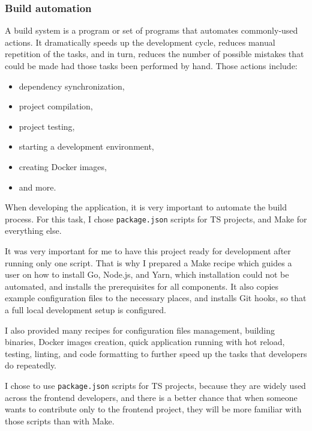 \subsubsection{Build automation}\label{sec:build-automation}

A build system is a program or set of programs
that automates commonly-used actions.
It dramatically speeds up the development cycle,
reduces manual repetition of the tasks,
and in turn,
reduces the number of possible mistakes
that could be made had those tasks
been performed by hand.
Those actions include:
\begin{itemize}
  \item dependency synchronization,
  \item project compilation,
  \item project testing,
  \item starting a development environment,
  \item creating Docker images,
  \item and more.
\end{itemize}

When developing the application,
it is very important to automate the build process.
For this task,
I chose \texttt{package.json} scripts
for \ac{TS} projects,
and Make for everything else.

It was very important for me
to have this project ready for development
after running only one script.
That is why I prepared a Make recipe
which guides a user on how to install
Go, Node.js, and Yarn,
which installation could not be automated,
and installs the prerequisites for all components.
It also copies example configuration files
to the necessary places,
and installs Git hooks,
so that a full local development setup
is configured.

I also provided many recipes
for configuration files management,
building binaries,
Docker images creation,
quick application running with hot reload,
testing,
linting, and
code formatting
to further speed up the tasks
that developers do repeatedly.

I chose to use \texttt{package.json} scripts
for \ac{TS} projects,
because they are widely used
across the frontend developers,
and there is a better chance
that when someone wants to contribute
only to the frontend project,
they will be more familiar with those scripts
than with Make.
